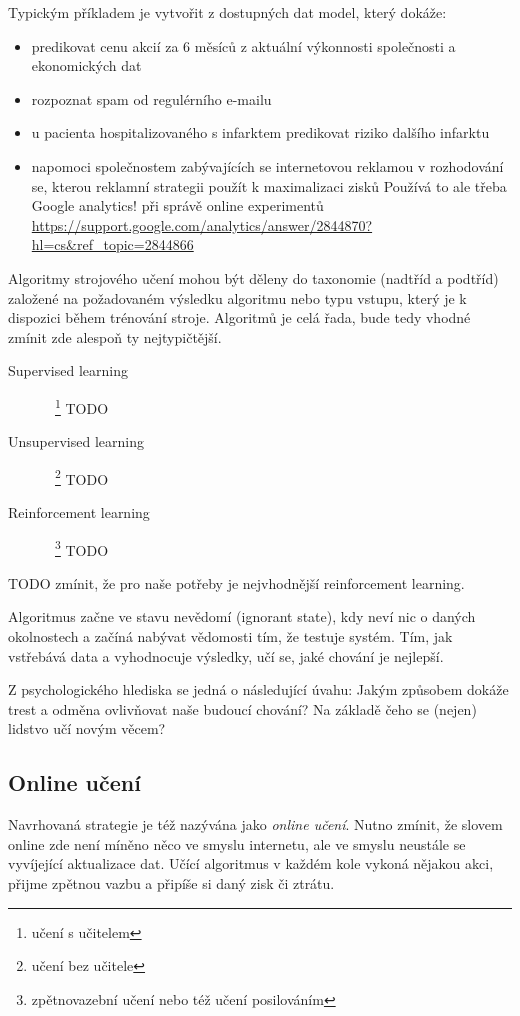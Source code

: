 \documentclass[thesis=M,czech]{FITthesis}[2014/05/07]
\begin{document}
Typickým příkladem je vytvořit z dostupných dat model, který dokáže:

\begin{itemize}
  \item predikovat cenu akcií za 6 měsíců z aktuální výkonnosti společnosti a ekonomických dat
  \item rozpoznat spam od regulérního e-mailu
  \item u pacienta hospitalizovaného s infarktem predikovat riziko dalšího infarktu
  \item napomoci společnostem zabývajících se internetovou reklamou v rozhodování se, kterou reklamní strategii použít k maximalizaci zisků
  Používá to ale třeba Google analytics! při správě online experimentů
\url{https://support.google.com/analytics/answer/2844870?hl=cs&ref_topic=2844866}
\end{itemize}

Algoritmy strojového učení mohou být děleny do taxonomie (nadtříd a podtříd) založené na požadovaném výsledku algoritmu nebo typu vstupu, který je k dispozici během trénování stroje. Algoritmů je celá řada, bude tedy vhodné zmínit zde alespoň ty nejtypičtější. 

\begin{description}
  \item[Supervised learning]~\footnote{učení s učitelem} TODO
  \item[Unsupervised learning]~\footnote{učení bez učitele} TODO
  \item[Reinforcement learning]~\footnote{zpětnovazební učení nebo též učení posilováním} TODO
\end{description}

TODO zmínit, že pro naše potřeby je nejvhodnější reinforcement learning.

Algoritmus začne ve stavu nevědomí (ignorant state), kdy neví nic o daných okolnostech a začíná nabývat vědomosti tím, že testuje systém. Tím, jak vstřebává data a vyhodnocuje výsledky, učí se, jaké chování je nejlepší.

Z psychologického hlediska se jedná o následující úvahu: Jakým způsobem dokáže trest a odměna ovlivňovat naše budoucí chování? Na základě čeho se (nejen) lidstvo učí novým věcem?

\subsection{Online učení}

Navrhovaná strategie je též nazývána jako \emph{online učení}. Nutno zmínit, že slovem online zde není míněno něco ve smyslu internetu, ale ve smyslu neustále se vyvíjející aktualizace dat. Učící algoritmus v každém kole vykoná nějakou akci, přijme zpětnou vazbu a připíše si daný zisk či ztrátu.
\end{document}
